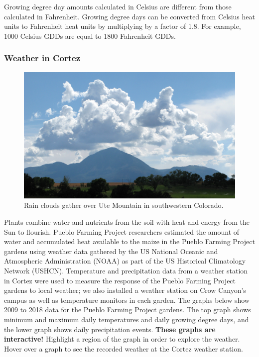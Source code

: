 \documentclass[12pt,]{article}
\begin{document}
Growing degree day amounts calculated in Celsius are different from those calculated in Fahrenheit. Growing degree days can be converted from Celsius heat units to Fahrenheit heat units by multiplying by a factor of 1.8. For example, 1000 Celsius GDDs are equal to 1800 Fahrenheit GDDs.

\hypertarget{weather-in-cortez}{%
\subsubsection*{Weather in Cortez}\label{weather-in-cortez}}

\begin{figure}
\centering
\includegraphics{./images/section_4.2_header.jpg}
\caption{Rain clouds gather over Ute Mountain in southwestern Colorado.}
\end{figure}

Plants combine water and nutrients from the soil with heat and energy from the Sun to flourish. Pueblo Farming Project researchers estimated the amount of water and accumulated heat available to the maize in the Pueblo Farming Project gardens using weather data gathered by the US National Oceanic and Atmospheric Administration (NOAA) as part of the US Historical Climatology Network (USHCN). Temperature and precipitation data from a weather station in Cortez were used to measure the response of the Pueblo Farming Project gardens to local weather; we also installed a weather station on Crow Canyon's campus as well as temperature monitors in each garden. The graphs below show 2009 to 2018 data for the Pueblo Farming Project gardens. The top graph shows minimum and maximum daily temperatures and daily growing degree days, and the lower graph shows daily precipitation events. \textbf{These graphs are interactive!} Highlight a region of the graph in order to explore the weather. Hover over a graph to see the recorded weather at the Cortez weather station.
\end{document}
